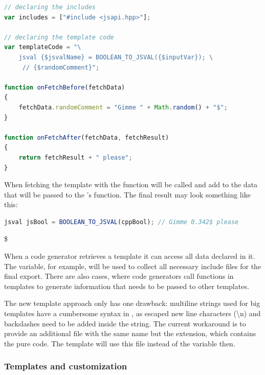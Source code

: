 \SingleSpacing
\begin{lstlisting}[language=JavaScript, caption=Example of a template file, label=lst:TemplateBool]
// declaring the includes
var includes = ["#include <jsapi.hpp>"];

// declaring the template code
var templateCode = "\
	jsval {$jsvalName} = BOOLEAN_TO_JSVAL({$inputVar}); \
	 // {$randomComment}";

function onFetchBefore(fetchData)
{
	fetchData.randomComment = "Gimme " + Math.random() + "$";
}

function onFetchAfter(fetchData, fetchResult)
{
	return fetchResult + " please";
}
\end{lstlisting}
\OnehalfSpacing

When fetching the template with  the  function will be called and add  to the data that will be passed to the 's  function. The final result may look something like this:

\SingleSpacing
\begin{lstlisting}[language=JavaScript, caption=Result of fetching a template]
jsval jsBool = BOOLEAN_TO_JSVAL(cppBool); // Gimme 0.342$ please
\end{lstlisting}
\OnehalfSpacing
\$

When a code generator retrieves a template it can access all data declared in it. The  variable, for example, will be used to collect all necessary include files for the final export. There are also cases, where code generators call functions in templates to generate information that needs to be passed to other templates.

The new template approach only has one drawback: multiline strings used for big \myProperName{jSmart} templates have a cumbersome syntax in \myProperName{JavaScript}, as escaped new line characters (\textbackslash n) and backslashes need to be added inside the string. The current workaround is to provide an additional file with the same name but the  extension, which contains the pure  code. The  template will use this file instead of the  variable then.

\subsubsection{Templates and customization}

